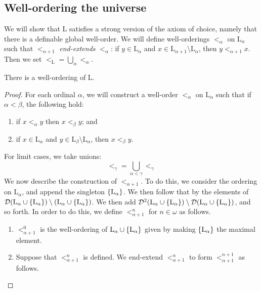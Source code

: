 \subsection{Well-ordering the universe}
We will show that \( \mathrm{L} \) satisfies a strong version of the axiom of choice, namely that there is a definable global well-order.
We will define well-orderings \( <_\alpha \) on \( \mathrm{L}_\alpha \) such that \( <_{\alpha + 1} \) \emph{end-extends} \( <_\alpha \): if \( y \in \mathrm{L}_\alpha \) and \( x \in \mathrm{L}_{\alpha + 1} \setminus \mathrm{L}_\alpha \), then \( y <_{\alpha + 1} x \).
Then we set \( <_{\mathrm{L}} = \bigcup_\alpha <_\alpha \).
\begin{theorem}
    There is a well-ordering of \( \mathrm{L} \).
\end{theorem}
\begin{proof}
    For each ordinal \( \alpha \), we will construct a well-order \( <_\alpha \) on \( \mathrm{L}_\alpha \) such that if \( \alpha < \beta \), the following hold:
    \begin{enumerate}
        \item if \( x <_\alpha y \) then \( x <_\beta y \); and
        \item if \( x \in \mathrm{L}_\alpha \) and \( y \in \mathrm{L}_\beta \setminus \mathrm{L}_\alpha \), then \( x <_\beta y \).
    \end{enumerate}
    For limit cases, we take unions:
    \[ <_\gamma = \bigcup_{\alpha < \gamma} <_\gamma \]
    We now describe the construction of \( <_{\alpha + 1} \).
    To do this, we consider the ordering on \( \mathrm{L}_\alpha \), and append the singleton \( \qty{\mathrm{L}_\alpha} \).
    We then follow that by the elements of \( \mathcal D(\mathrm{L}_\alpha \cup \qty{\mathrm{L}_\alpha}) \setminus (\mathrm{L}_\alpha \cup \qty{\mathrm{L}_\alpha}) \).
    We then add \( \mathcal D^2(\mathrm{L}_\alpha \cup \qty{\mathrm{L}_\alpha}) \setminus \mathcal D(\mathrm{L}_\alpha \cup \qty{\mathrm{L}_\alpha}) \), and so forth.
    In order to do this, we define \( <_{\alpha + 1}^n \) for \( n \in \omega \) as follows.
    \begin{enumerate}
        \item \( <_{\alpha + 1}^0 \) is the well-ordering of \( \mathrm{L}_\alpha \cup \qty{\mathrm{L}_\alpha} \) given by making \( \qty{\mathrm{L}_\alpha} \) the maximal element.
        \item Suppose that \( <_{\alpha + 1}^n \) is defined.
        We end-extend \( <_{\alpha + 1}^n \) to form \( <_{\alpha + 1}^{n + 1} \) as follows.

\end{enumerate}
\end{proof}
